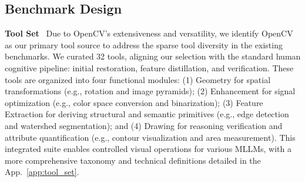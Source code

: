 \documentclass[runningheads]{llncs}
\begin{document}
\subsection{Benchmark Design}\label{sec:design}
\noindent \textbf{Tool Set}~
Due to OpenCV's extensiveness and versatility, we identify OpenCV~\cite{itseez2014theopencv} as our primary tool source to address the sparse tool diversity in the existing benchmarks.
We curated 32 tools, aligning our selection with the standard human cognitive pipeline: initial restoration, feature distillation, and verification. These tools are organized into four functional modules: (1) Geometry for spatial transformations (e.g., rotation and image pyramids); (2) Enhancement for signal optimization (e.g., color space conversion and binarization); (3) Feature Extraction for deriving structural and semantic primitives (e.g., edge detection and watershed segmentation); and (4) Drawing for reasoning verification and attribute quantification (e.g., contour visualization and area measurement). This integrated suite enables controlled visual operations for various MLLMs, with a more comprehensive taxonomy and technical definitions detailed in the App.~\ref{app:tool_set}.
\end{document}
